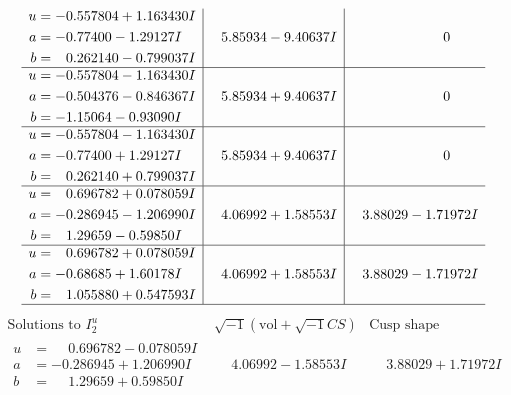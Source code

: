 \documentclass[1p]{elsarticle_modified}
\theoremstyle{definition}
\newcommand{\I}{\sqrt{-1}}
\begin{document}
$$\begin{array}{c|c|c}
\begin{aligned}
u &= -0.557804 + 1.163430 I \\
a &= -0.77400 - 1.29127 I \\
b &= \phantom{-}0.262140 - 0.799037 I\end{aligned}
 & \phantom{-}5.85934 - 9.40637 I & \phantom{-0.000000 } 0 \\ \hline\begin{aligned}
u &= -0.557804 - 1.163430 I \\
a &= -0.504376 - 0.846367 I \\
b &= -1.15064 - 0.93090 I\end{aligned}
 & \phantom{-}5.85934 + 9.40637 I & \phantom{-0.000000 } 0 \\ \hline\begin{aligned}
u &= -0.557804 - 1.163430 I \\
a &= -0.77400 + 1.29127 I \\
b &= \phantom{-}0.262140 + 0.799037 I\end{aligned}
 & \phantom{-}5.85934 + 9.40637 I & \phantom{-0.000000 } 0 \\ \hline\begin{aligned}
u &= \phantom{-}0.696782 + 0.078059 I \\
a &= -0.286945 - 1.206990 I \\
b &= \phantom{-}1.29659 - 0.59850 I\end{aligned}
 & \phantom{-}4.06992 + 1.58553 I & \phantom{-}3.88029 - 1.71972 I \\ \hline\begin{aligned}
u &= \phantom{-}0.696782 + 0.078059 I \\
a &= -0.68685 + 1.60178 I \\
b &= \phantom{-}1.055880 + 0.547593 I\end{aligned}
 & \phantom{-}4.06992 + 1.58553 I & \phantom{-}3.88029 - 1.71972 I\\
 \hline 
 \end{array}$$\newpage$$\begin{array}{c|c|c}  
\text{Solutions to }I^u_{2}& \I (\text{vol} + \sqrt{-1}CS) & \text{Cusp shape}\\
 \hline 
\begin{aligned}
u &= \phantom{-}0.696782 - 0.078059 I \\
a &= -0.286945 + 1.206990 I \\
b &= \phantom{-}1.29659 + 0.59850 I\end{aligned}
 & \phantom{-}4.06992 - 1.58553 I & \phantom{-}3.88029 + 1.71972 I \\ \hline\begin{aligned}

\end{aligned}
\end{array}$$
\end{document}
